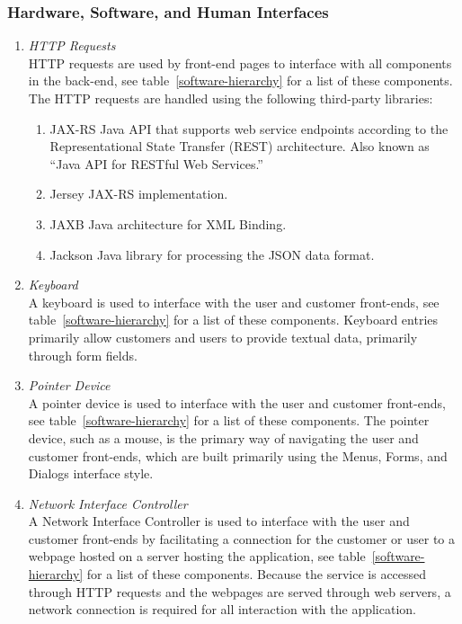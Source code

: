 \documentclass{article}
\newcommand{\br}{\vspace{2mm}}
\begin{document}
\subsubsection{Hardware, Software, and Human Interfaces}
\label{hshi}

\begin{enumerate}
    \item[~\ref{hshi}.1 ] \emph{HTTP Requests}\br\\
        HTTP requests are used by front-end pages to interface with all
        components in the back-end, see table~\ref{software-hierarchy} for a
        list of these components.  The HTTP requests are handled using the
        following third-party libraries:
        \begin{enumerate}
            \item JAX-RS
                Java API that supports web service endpoints according to the
                Representational State Transfer (REST) architecture.  Also known
                as ``Java API for RESTful Web Services.''
            \item Jersey
                JAX-RS implementation.
            \item JAXB
                Java architecture for XML Binding.
            \item Jackson
                Java library for processing the JSON data format.
        \end{enumerate}
    \item[~\ref{hshi}.2 ] \emph{Keyboard}\br\\
        A keyboard is used to interface with the user and customer front-ends,
        see table~\ref{software-hierarchy} for a list of these components.  Keyboard
        entries primarily allow customers and users to provide textual data,
        primarily through form fields.
    \item[~\ref{hshi}.3 ] \emph{Pointer Device}\br\\
        A pointer device is used to interface with the user and customer
        front-ends, see table~\ref{software-hierarchy} for a list of these
        components.  The pointer device, such as a mouse, is the primary
        way of navigating the user and customer front-ends, which are built
        primarily using the Menus, Forms, and Dialogs interface style.
    \item[~\ref{hshi}.4 ] \emph{Network Interface Controller}\br\\
        A Network Interface Controller is used to interface with the user and
        customer front-ends by facilitating a connection for the customer or
        user to a webpage hosted on a server hosting the application, see
        table~\ref{software-hierarchy} for a list of these components.  Because
        the service is accessed through HTTP requests and the webpages are
        served through web servers, a network connection is required for all
        interaction with the application.
\end{enumerate}
\end{document}

